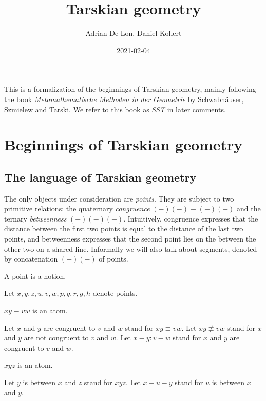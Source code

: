 \documentclass[10pt,a4paper,parskip=half,numbers=endperiod,headings=standardclasses,parskip]{scrbook}
\title{Tarskian geometry}
\author{Adrian De Lon, Daniel Kollert}
\date{2021-02-04}
\newcommand{\Cong}[4]{#1 #2 \equiv #3 #4}
\newcommand{\NotCong}[4]{#1 #2 \not\equiv #3 #4}
\newcommand{\Betw}[3]{#1 #2 #3}
\begin{document}

  \maketitle

  This is a formalization of the beginnings of Tarskian geometry,
  mainly following the book
  \textit{Metamathematische Methoden in der Geometrie}
  by Schwabhäuser, Szmielew and Tarski.
  We refer to this book as \textit{SST} in later comments.


  \tableofcontents

  \chapter{Beginnings of Tarskian geometry}

  \section{The language of Tarskian geometry}

  The only objects under consideration are \textit{points}.
  They are subject to two primitive relations:
  the quaternary \textit{congruence} $\Cong{(-)}{(-)}{(-)}{(-)}$
  and the ternary \textit{betweenness} $\Betw{(-)}{(-)}{(-)}$.
  Intuitively, congruence expresses that the distance between the first two points is equal to the distance of the last two points, and betweenness expresses that
  the second point lies on the between the other two on a shared line.
  Informally we will also talk about segments, denoted by concatenation $(-)(-)$ of points.


  \begin{forthel}

    \begin{signature}
      A point is a notion.
    \end{signature}

    Let $x, y, z, u, v, w, p, q, r, g, h$ denote points.


    \begin{signature}
      $\Cong{x}{y}{v}{w}$ is an atom.
    \end{signature}
    Let $x$ and $y$ are congruent to $v$ and $w$ stand for $\Cong{x}{y}{v}{w}$.
    Let $\NotCong{x}{y}{v}{w}$ stand for $x$ and $y$ are not congruent to $v$ and $w$.
    Let $x-y : v-w$ stand for $x$ and $y$ are congruent to $v$ and $w$.

    \begin{signature}
      $\Betw{x}{y}{z}$ is an atom.
    \end{signature}

    Let $y$ is between $x$ and $z$ stand for $\Betw{x}{y}{z}$.
    Let $x-u-y$ stand for $u$ is between $x$ and $y$.
  \end{forthel}
\end{document}
